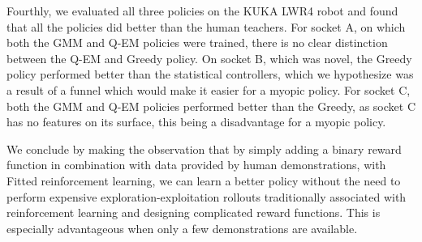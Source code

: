 Fourthly, we evaluated all three policies on the KUKA LWR4 robot and found that all the policies did better than the human 
teachers. For socket A, on which both the GMM and Q-EM policies were trained, there is no clear distinction between 
the Q-EM and Greedy policy. On socket B, which was novel, the Greedy policy performed better than the statistical controllers, 
which we hypothesize was a result of a funnel which would make it easier for a myopic policy. For socket C, both the 
GMM and Q-EM policies performed better than the Greedy, as socket C has no features on its surface, this being a disadvantage 
for a myopic policy.

We conclude by making the observation that by simply adding a binary reward function in combination with 
data provided by human demonstrations, with Fitted reinforcement learning, we can learn a better policy without 
the need to perform expensive exploration-exploitation rollouts traditionally associated with reinforcement learning and 
designing complicated reward functions. This is especially advantageous when only a few demonstrations are available.
